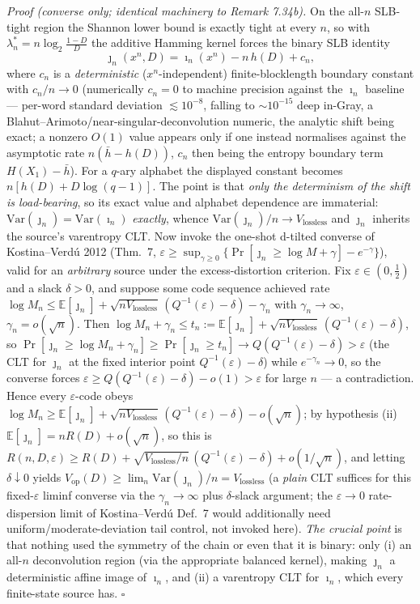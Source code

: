 \documentclass[
]{article}
\begin{document}
\emph{Proof (converse only; identical machinery to Remark 7.34b).} On the all-$n$ SLB-tight region the
Shannon lower bound is exactly tight at every $n$, so with $\lambda_n^*=n\log_2\frac{1-D}D$ the additive
Hamming kernel forces the binary SLB identity
\[
  \jmath_n(x^n,D)=\imath_n(x^n)-n\,h(D)+c_n,
\]
where $c_n$ is a \emph{deterministic} ($x^n$-independent) finite-blocklength boundary constant with
$c_n/n\to0$ (numerically $c_n=0$ to machine precision against the $\imath_n$ baseline --- per-word
standard deviation $\lesssim10^{-8}$, falling to $\sim10^{-15}$ deep in-Gray, a
Blahut--Arimoto/near-singular-deconvolution numeric, the analytic shift being exact; a nonzero $O(1)$
value appears only if one instead normalises against the asymptotic rate $n(\bar h-h(D))$, $c_n$ then
being the entropy boundary term $H(X_1)-\bar h$).
For a $q$-ary alphabet the displayed constant becomes $n[h(D)+D\log(q-1)]$. The point is that \emph{only
the determinism of the shift is load-bearing}, so its exact value and alphabet dependence are immaterial:
$\mathrm{Var}(\jmath_n)=\mathrm{Var}(\imath_n)$ \emph{exactly}, whence
$\mathrm{Var}(\jmath_n)/n\to V_{\mathrm{lossless}}$ and $\jmath_n$ inherits the source's varentropy CLT.
Now invoke the one-shot d-tilted converse of Kostina--Verd\'u 2012 (Thm.~7,
$\varepsilon\ge\sup_{\gamma\ge0}\{\Pr[\jmath_n\ge\log M+\gamma]-e^{-\gamma}\}$), valid for an
\emph{arbitrary} source under the excess-distortion criterion. Fix $\varepsilon\in(0,\tfrac12)$ and a
slack $\delta>0$, and suppose some code sequence achieved rate
$\log M_n\le\mathbb E[\jmath_n]+\sqrt{nV_{\mathrm{lossless}}}\,(Q^{-1}(\varepsilon)-\delta)-\gamma_n$
with $\gamma_n\to\infty$, $\gamma_n=o(\sqrt n)$. Then
$\log M_n+\gamma_n\le t_n:=\mathbb E[\jmath_n]+\sqrt{nV_{\mathrm{lossless}}}\,(Q^{-1}(\varepsilon)-\delta)$,
so $\Pr[\jmath_n\ge\log M_n+\gamma_n]\ge\Pr[\jmath_n\ge t_n]\to Q(Q^{-1}(\varepsilon)-\delta)>\varepsilon$
(the CLT for $\jmath_n$ at the fixed interior point $Q^{-1}(\varepsilon)-\delta$) while $e^{-\gamma_n}\to0$,
so the converse forces $\varepsilon\ge Q(Q^{-1}(\varepsilon)-\delta)-o(1)>\varepsilon$
for large $n$ --- a contradiction. Hence every $\varepsilon$-code obeys
$\log M_n\ge\mathbb E[\jmath_n]+\sqrt{nV_{\mathrm{lossless}}}\,(Q^{-1}(\varepsilon)-\delta)-o(\sqrt n)$;
by hypothesis (ii) $\mathbb E[\jmath_n]=nR(D)+o(\sqrt n)$, so this is
$R(n,D,\varepsilon)\ge R(D)+\sqrt{V_{\mathrm{lossless}}/n}\,(Q^{-1}(\varepsilon)-\delta)+o(1/\sqrt n)$,
and letting $\delta\downarrow0$ yields
$V_{\mathrm{op}}(D)\ge\lim_n\mathrm{Var}(\jmath_n)/n=V_{\mathrm{lossless}}$ (a \emph{plain} CLT suffices
for this fixed-$\varepsilon$ liminf converse via the $\gamma_n\!\to\!\infty$ plus $\delta$-slack
argument; the $\varepsilon\to0$ rate-dispersion limit of Kostina--Verd\'u Def.~7 would additionally need
uniform/moderate-deviation tail control, not invoked here). \emph{The crucial point} is that nothing used
the symmetry of the chain or even that it is binary: only (i) an all-$n$ deconvolution region (via the
appropriate balanced kernel), making $\jmath_n$ a deterministic affine image of $\imath_n$, and (ii) a
varentropy CLT for $\imath_n$, which every finite-state source has. $\square$
\end{document}
